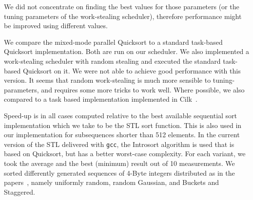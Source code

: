 \documentclass[preprint]{sigplanconf}
\begin{document}
We did not concentrate on finding the best values for those parameters
(or the tuning parameters of the work-stealing scheduler), therefore
performance might be improved using different values.

We compare the mixed-mode parallel Quicksort to a standard task-based
Quicksort implementation. Both are run on our scheduler. We also
implemented a work-stealing scheduler with random stealing and
executed the standard task-based Quicksort on it.  We were not able to
achieve good performance with this version. It seems that random
work-stealing is much more sensible to tuning-parameters, and requires
some more tricks to work well.  Where possible, we also compared to a
task based implementation implemented in
Cilk~\cite{BlumofeJoergKuszmaulLeisersonRandallZhou96}.

Speed-up is in all cases computed relative to the best available
sequential sort implementation which we take to be the STL sort
function. This is also used in our implementation for subsequences
shorter than 512 elements. In the current version of the STL delivered
with \texttt{gcc}, the Introsort algorithm is used that is based on
Quicksort, but has a better worst-case complexity. For each variant,
we took the average and the best (minimum) result out of 10
measurements. We sorted differently generated sequences of 4-Byte
integers distributed as in the
papers~\cite{HelmanBaderJaja98,TsigasZhang03}, namely uniformly
random, random Gaussian, and Buckets and Staggered.
\end{document}
